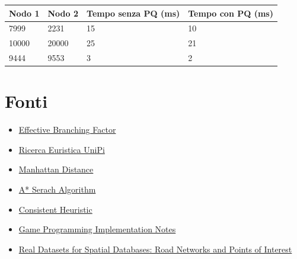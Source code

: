 \documentclass[12pt,a4paper]{report}
\begin{document}
\begin{table}[H]
	\centering
	\begin{tabular}{@{}llll@{}}
		\toprule
		\textbf{Nodo 1} & \textbf{Nodo 2} & \textbf{Tempo senza PQ (ms)} & \textbf{Tempo con PQ (ms)}\\ \midrule
		7999 & 2231  & 15  & 10  \\
		10000 & 20000  & 25  & 21  \\
		9444 & 9553  & 3  & 2  \\ \bottomrule
	\end{tabular}
\end{table}


\chapter{Fonti}

\begin{itemize}
	\item \href{http://ozark.hendrix.edu/~ferrer/courses/335/f11/lectures/effective-branching.html}{Effective Branching Factor}
	\item \href{http://pages.di.unipi.it/micheli/DID/IIA-2016/part1/4e5-2016-infosearch-post-lez.pdf}{Ricerca Euristica UniPi}
	\item \href{https://www.geeksforgeeks.org/sum-manhattan-distances-pairs-points/}{Manhattan Distance}
	\item \href{https://en.wikipedia.org/wiki/A*_search_algorithm}{A* Serach Algorithm}
	\item \href{https://en.wikipedia.org/wiki/Consistent_heuristic}{Consistent Heuristic}
	\item \href{http://theory.stanford.edu/~amitp/GameProgramming/ImplementationNotes.html}{Game Programming Implementation Notes}
	\item \href{https://www.cs.utah.edu/~lifeifei/SpatialDataset.htm}{Real Datasets for Spatial Databases: Road Networks and Points of Interest}
\end{itemize}
\end{document}

